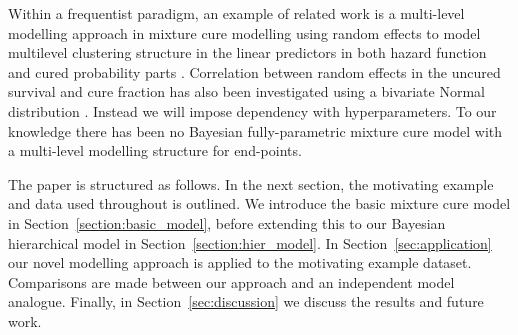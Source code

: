 \documentclass[AMA,STIX1COL]{WileyNJD-v2}
\begin{document}
Within a frequentist paradigm, an example of related work is a multi-level modelling approach in mixture cure modelling using random effects to model multilevel clustering structure in the linear predictors in both hazard function and cured probability parts \cite{Lai2009}.
Correlation between random effects in the uncured survival and cure fraction has also been investigated using a bivariate Normal distribution \cite{Lai2008} \cite{Tan2018}.
Instead we will impose dependency with hyperparameters.
To our knowledge there has been no Bayesian fully-parametric mixture cure model with a multi-level modelling structure for end-points.

The paper is structured as follows.
In the next section, the motivating example and data used throughout is outlined.
We introduce the basic mixture cure model in Section~\ref{section:basic_model}, before extending this to our Bayesian hierarchical model in Section~\ref{section:hier_model}.
In Section~\ref{sec:application} our novel modelling approach is applied to the motivating example dataset.
Comparisons are made between our approach and an independent model analogue.
Finally, in Section~\ref{sec:discussion} we discuss the results and future work.
\end{document}
